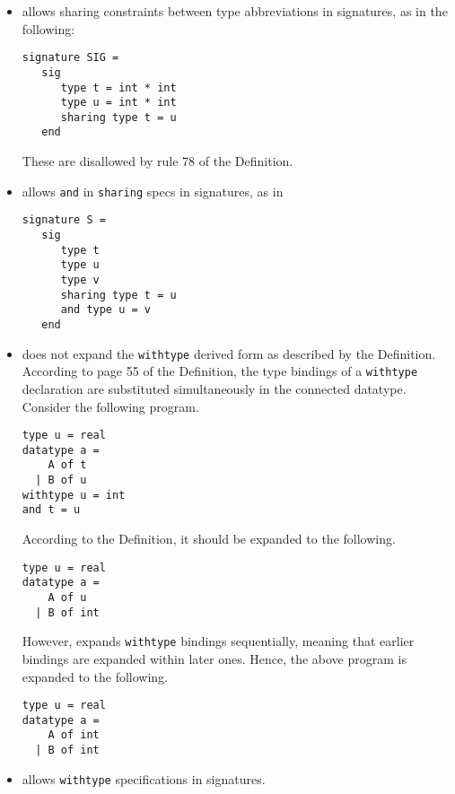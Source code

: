 \begin{itemize}
\item
{\smlnj} allows sharing constraints between type abbreviations in
signatures, as in the following:
\begin{verbatim}
signature SIG =
   sig
      type t = int * int
      type u = int * int
      sharing type t = u
   end
\end{verbatim}
These are disallowed by rule 78 of the Definition.

\item
{\smlnj} allows {\tt and} in {\tt sharing} specs in signatures, as in
\begin{verbatim}
signature S =
   sig
      type t
      type u
      type v
      sharing type t = u
      and type u = v
   end
\end{verbatim}
%
\item
{\smlnj} does not expand the {\tt withtype} derived form as described by
the Definition.  According to page 55 of the Definition, the type
bindings of a {\tt withtype} declaration are substituted simultaneously
in the connected datatype.  Consider the following program.
\begin{verbatim}
type u = real
datatype a =
    A of t
  | B of u
withtype u = int
and t = u
\end{verbatim}
According to the Definition, it should be expanded to the following.
\begin{verbatim}
type u = real
datatype a =
    A of u
  | B of int
\end{verbatim}
However, {\smlnj} expands {\tt withtype} bindings sequentially, meaning
that earlier bindings are expanded within later ones.  Hence, the
above program is expanded to the following.
\begin{verbatim}
type u = real
datatype a =
    A of int
  | B of int
\end{verbatim}
%
\item
{\smlnj} allows {\tt withtype} specifications in signatures.


\end{itemize}

